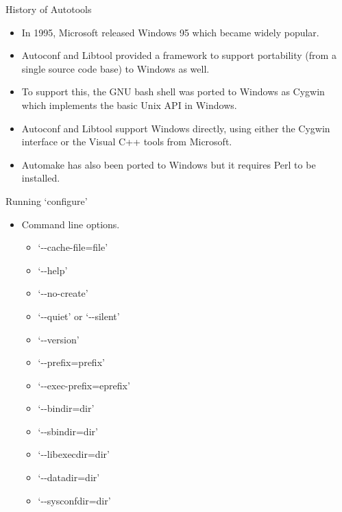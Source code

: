 \documentclass{beamer}
\begin{document}
\begin{frame}{History of Autotools}
\begin{itemize}
	\item In 1995, Microsoft released Windows 95 which became widely popular.\pause
	\item Autoconf and Libtool provided a framework to support portability (from a single source code base) to Windows as well.\pause
	\item To support this, the GNU bash shell was ported to Windows as Cygwin which implements the basic Unix API in Windows. \pause
	\item Autoconf and Libtool support Windows directly, using either the Cygwin interface or the Visual C++ tools from Microsoft.\pause
	\item Automake has also been ported to Windows but it requires Perl to be installed.
\end{itemize}
\end{frame}

\begin{frame}{Running `configure'}
\begin{itemize}
	\item Command line options.
	\begin{itemize}
		\item `-\hspace*{0.01cm}-cache-file=file' \pause
		\item `-\hspace*{0.01cm}-help' \pause
		\item `-\hspace*{0.01cm}-no-create' \pause
		\item `-\hspace*{0.01cm}-quiet' or `-\hspace*{0.01cm}-silent' \pause
		\item `-\hspace*{0.01cm}-version' \pause
		\item `-\hspace*{0.01cm}-prefix=prefix' \pause
		\item `-\hspace*{0.01cm}-exec-prefix=eprefix' \pause
		\item `-\hspace*{0.01cm}-bindir=dir'  \pause
		\item `-\hspace*{0.01cm}-sbindir=dir' \pause
		\item `-\hspace*{0.01cm}-libexecdir=dir' \pause
		\item `-\hspace*{0.01cm}-datadir=dir' \pause
		\item `-\hspace*{0.01cm}-sysconfdir=dir' \pause
		
	\end{itemize}
\end{itemize}
\end{frame}
\end{document}
